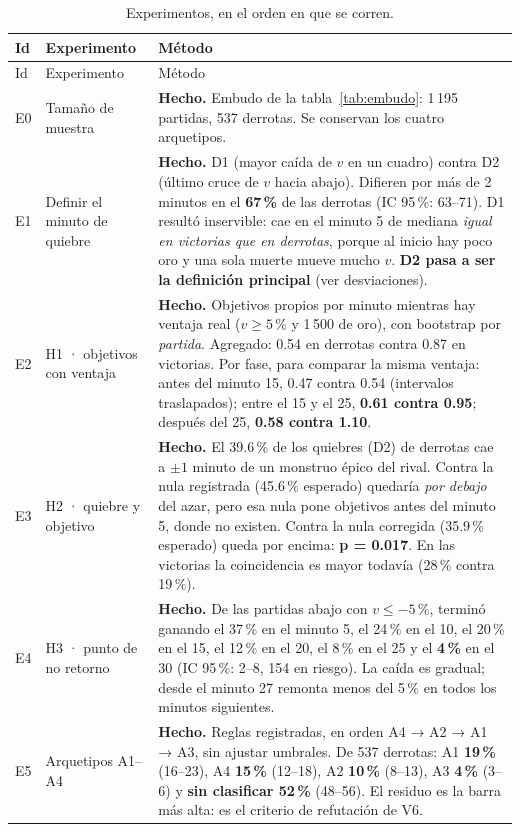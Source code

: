 \documentclass[11pt,letterpaper]{article}
\newcommand{\dato}[1]{\textbf{\textcolor{azul}{#1}}}
\begin{document}
\begin{longtable}{p{1.0cm}p{4.2cm}p{9.4cm}}
\caption{Experimentos, en el orden en que se corren.}\\
\toprule
Id & Experimento & Método \\
\midrule
\endfirsthead
\toprule
Id & Experimento & Método \\
\midrule
\endhead
E0 & Tamaño de muestra & \textbf{Hecho.} Embudo de la tabla~\ref{tab:embudo}: 1\,195 partidas, 537 derrotas. Se conservan los cuatro arquetipos. \\
\addlinespace
E1 & Definir el minuto de quiebre & \textbf{Hecho.} D1 (mayor caída de \(v\) en un cuadro) contra D2 (último cruce de \(v\) hacia abajo). Difieren por más de 2 minutos en el \dato{67\,\%} de las derrotas (IC 95\,\%: 63--71). D1 resultó inservible: cae en el minuto 5 de mediana \emph{igual en victorias que en derrotas}, porque al inicio hay poco oro y una sola muerte mueve mucho \(v\). \textbf{D2 pasa a ser la definición principal} (ver desviaciones). \\
\addlinespace
E2 & H1 · objetivos con ventaja & \textbf{Hecho.} Objetivos propios por minuto mientras hay ventaja real (\(v \ge 5\)\,\% y 1\,500 de oro), con bootstrap por \emph{partida}. Agregado: 0.54 en derrotas contra 0.87 en victorias. Por fase, para comparar la misma ventaja: antes del minuto 15, 0.47 contra 0.54 (intervalos traslapados); entre el 15 y el 25, \dato{0.61 contra 0.95}; después del 25, \dato{0.58 contra 1.10}. \\
\addlinespace
E3 & H2 · quiebre y objetivo & \textbf{Hecho.} El 39.6\,\% de los quiebres (D2) de derrotas cae a \(\pm 1\) minuto de un monstruo épico del rival. Contra la nula registrada (45.6\,\% esperado) quedaría \emph{por debajo} del azar, pero esa nula pone objetivos antes del minuto 5, donde no existen. Contra la nula corregida (35.9\,\% esperado) queda por encima: \dato{p = 0.017}. En las victorias la coincidencia es mayor todavía (28\,\% contra 19\,\%). \\
\addlinespace
E4 & H3 · punto de no retorno & \textbf{Hecho.} De las partidas abajo con \(v \le -5\)\,\%, terminó ganando el 37\,\% en el minuto 5, el 24\,\% en el 10, el 20\,\% en el 15, el 12\,\% en el 20, el 8\,\% en el 25 y el \dato{4\,\%} en el 30 (IC 95\,\%: 2--8, 154 en riesgo). La caída es gradual; desde el minuto 27 remonta menos del 5\,\% en todos los minutos siguientes. \\
\addlinespace
E5 & Arquetipos A1--A4 & \textbf{Hecho.} Reglas registradas, en orden A4 → A2 → A1 → A3, sin ajustar umbrales. De 537 derrotas: A1 \dato{19\,\%} (16--23), A4 \dato{15\,\%} (12--18), A2 \dato{10\,\%} (8--13), A3 \dato{4\,\%} (3--6) y \dato{sin clasificar 52\,\%} (48--56). El residuo es la barra más alta: es el criterio de refutación de V6. \\

\end{longtable}
\end{document}
